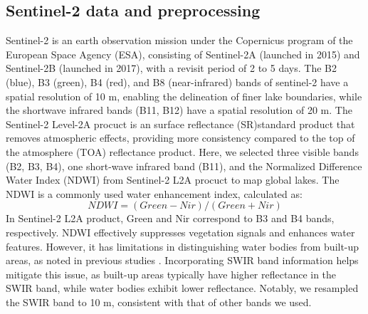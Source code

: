 \documentclass[preprint,12pt,authoryear]{elsarticle}
\begin{document}
\subsection{Sentinel-2 data and preprocessing}
\label{subsec1}

Sentinel-2 is an earth observation mission under the Copernicus program of the European Space Agency (ESA), consisting of Sentinel-2A (launched in 2015) and Sentinel-2B (launched in 2017), with a revisit period of 2 to 5 days. The B2 (blue), B3 (green), B4 (red), and B8 (near-infrared) bands of sentinel-2 have a spatial resolution of 10 m, enabling the delineation of finer lake boundaries, while the shortwave infrared bands (B11, B12) have a spatial resolution of 20 m. The Sentinel-2 Level-2A procuct is an surface reflectance (SR)standard product that removes atmospheric effects, providing more consistency compared to the top of the atmosphere (TOA) reflectance product. Here, we selected three visible bands (B2, B3, B4), one short-wave infrared band (B11), and the Normalized Difference Water Index (NDWI) \citep{mcfeeters_use_1996} from Sentinel-2 L2A procuct to map global lakes. The NDWI is a commonly used water enhancement index, calculated as:
\begin{equation}
NDWI = (Green-Nir)/(Green+Nir)
\end{equation}
In Sentinel-2 L2A product, Green and Nir correspond to B3 and B4 bands, respectively. NDWI effectively suppresses vegetation signals and enhances water features. However, it has limitations in distinguishing water bodies from built-up areas, as noted in previous studies \citep{xu_modification_2006}. Incorporating SWIR band information helps mitigate this issue, as built-up areas typically have higher reflectance in the SWIR band, while water bodies exhibit lower reflectance. Notably, we resampled the SWIR band to 10 m, consistent with that of other bands we used.
\end{document}
